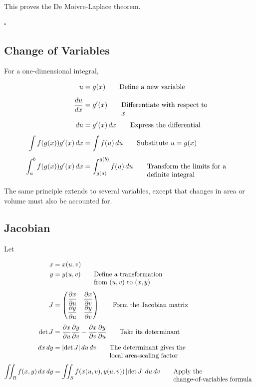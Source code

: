 \documentclass{article}
\newcommand{\justwidth}{0.36\textwidth}
\newcommand{\just}[1]{\parbox[t]{\justwidth}{\raggedright #1}}
\newlength{\defaultparwidth}
\newcommand{\defaultwidthpar}[1]{%
  \par
  \noindent\hfill
  \begin{minipage}{\defaultparwidth}%
  #1%
  \end{minipage}%
  \hfill\null
  \par
}
\begin{document}
\defaultwidthpar{This proves the De Moivre-Laplace theorem.}

$\square$

\subsection{Change of Variables}
\defaultwidthpar{For a one-dimensional integral,}

\begin{align*}
u
&=
g(x)
\tag*{\just{Define a new variable}}
\\[0.45em]
\frac{du}{dx}
&=
g'(x)
\tag*{\just{Differentiate with respect to $x$}}
\\[0.45em]
du
&=
g'(x)\,dx
\tag*{\just{Express the differential}}
\\[0.45em]
\int
f(g(x))g'(x)\,dx
&=
\int
f(u)\,du
\tag*{\just{Substitute $u=g(x)$}}
\\[0.45em]
\int_a^b
f(g(x))g'(x)\,dx
&=
\int_{g(a)}^{g(b)}
f(u)\,du
\tag*{\just{Transform the limits for a definite integral}}
\end{align*}

\defaultwidthpar{The same principle extends to several variables, except that changes in area or volume must also be accounted for.}

\subsection{Jacobian}
Let

\begin{align*}
x
&=
x(u,v)
\\
y
&=
y(u,v)
\tag*{\just{Define a transformation from $(u,v)$ to $(x,y)$}}
\\[0.45em]
J
&=
\begin{pmatrix}
\dfrac{\partial x}{\partial u}
&
\dfrac{\partial x}{\partial v}
\\
\dfrac{\partial y}{\partial u}
&
\dfrac{\partial y}{\partial v}
\end{pmatrix}
\tag*{\just{Form the Jacobian matrix}}
\\[0.45em]
\det J
&=
\frac{\partial x}{\partial u}
\frac{\partial y}{\partial v}
-
\frac{\partial x}{\partial v}
\frac{\partial y}{\partial u}
\tag*{\just{Take its determinant}}
\\[0.45em]
dx\,dy
&=
\left|
\det J
\right|
du\,dv
\tag*{\just{The determinant gives the local area-scaling factor}}
\\[0.45em]
\iint_R
f(x,y)\,dx\,dy
&=
\iint_S
f(x(u,v),y(u,v))
\left|
\det J
\right|
du\,dv
\tag*{\just{Apply the change-of-variables formula}}
\end{align*}
\end{document}
